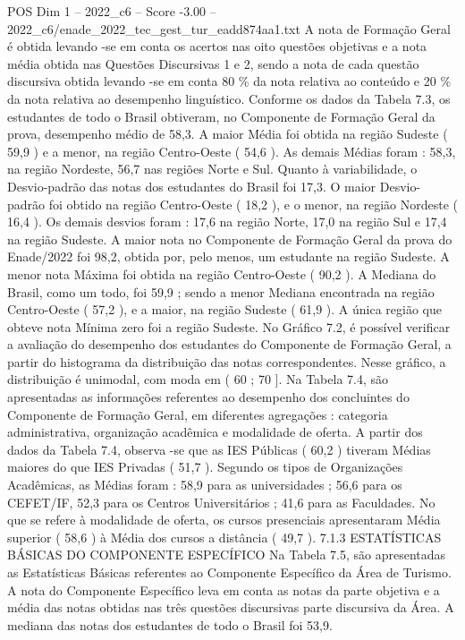 \begin{textsample}{POS Dim 1 – 2022\_c6 – Score -3.00 – 2022\_c6/enade\_2022\_tec\_gest\_tur\_eadd874aa1.txt}
A nota de Formação Geral é obtida levando -se em conta os acertos nas oito questões objetivas e a nota média obtida nas Questões Discursivas 1 e 2, sendo a nota de cada questão discursiva obtida levando -se em conta 80 \% da nota relativa ao conteúdo e 20 \% da nota relativa ao desempenho linguístico.
Conforme os dados da Tabela 7.3, os estudantes de todo o Brasil obtiveram, no Componente de Formação Geral da prova, desempenho médio de 58,3.
A maior Média foi obtida na região Sudeste ( 59,9 ) e a menor, na região Centro-Oeste ( 54,6 ).
As demais Médias foram : 58,3, na região Nordeste, 56,7 nas regiões Norte e Sul.
Quanto à variabilidade, o Desvio-padrão das notas dos estudantes do Brasil foi 17,3.
O maior Desvio-padrão foi obtido na região Centro-Oeste ( 18,2 ), e o menor, na região Nordeste ( 16,4 ).
Os demais desvios foram : 17,6 na região Norte, 17,0 na região Sul e 17,4 na região Sudeste.
A maior nota no Componente de Formação Geral da prova do Enade/2022 foi 98,2, obtida por, pelo menos, um estudante na região Sudeste.
A menor nota Máxima foi obtida na região Centro-Oeste ( 90,2 ).
A Mediana do Brasil, como um todo, foi 59,9 ; sendo a menor Mediana encontrada na região Centro-Oeste ( 57,2 ), e a maior, na região Sudeste ( 61,9 ).
A única região que obteve nota Mínima zero foi a região Sudeste.
No Gráfico 7.2, é possível verificar a avaliação do desempenho dos estudantes do Componente de Formação Geral, a partir do histograma da distribuição das notas correspondentes.
Nesse gráfico, a distribuição é unimodal, com moda em ( 60 ; 70 ].
Na Tabela 7.4, são apresentadas as informações referentes ao desempenho dos concluintes do Componente de Formação Geral, em diferentes agregações : categoria administrativa, organização acadêmica e modalidade de oferta.
A partir dos dados da Tabela 7.4, observa -se que as IES Públicas ( 60,2 ) tiveram Médias maiores do que IES Privadas ( 51,7 ).
Segundo os tipos de Organizações Acadêmicas, as Médias foram : 58,9 para as universidades ; 56,6 para os CEFET/IF, 52,3 para os Centros Universitários ; 41,6 para as Faculdades.
No que se refere à modalidade de oferta, os cursos presenciais apresentaram Média superior ( 58,6 ) à Média dos cursos a distância ( 49,7 ). 7.1.3 ESTATÍSTICAS BÁSICAS DO COMPONENTE ESPECÍFICO Na Tabela 7.5, são apresentadas as Estatísticas Básicas referentes ao Componente Específico da Área de Turismo.
A nota do Componente Específico leva em conta as notas da parte objetiva e a média das notas obtidas nas três questões discursivas parte discursiva da Área.
A mediana das notas dos estudantes de todo o Brasil foi 53,9.

\end{textsample}
